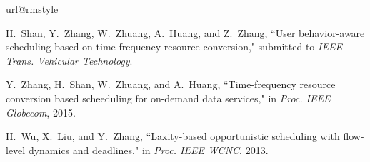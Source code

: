 \documentclass[journal,letterpaper,12pt,oneside,onecolumn,draftclsnofoot]{IEEEtran}
\begin{document}
\begin{thebibliography}{10}

\providecommand{\url}[1]{#1} \csname url@rmstyle\endcsname
\providecommand{\newblock}{\relax} \providecommand{\bibinfo}[2]{#2}
\providecommand\BIBentrySTDinterwordspacing{\spaceskip=0pt\relax}
\providecommand\BIBentryALTinterwordstretchfactor{4}
\providecommand\BIBentryALTinterwordspacing{\spaceskip=\fontdimen2\font
plus \BIBentryALTinterwordstretchfactor\fontdimen3\font minus
  \fontdimen4\font\relax}
\providecommand\BIBforeignlanguage[2]{{\expandafter\ifx\csname l@#1\endcsname\relax
\typeout{** WARNING: IEEEtran.bst: No hyphenation pattern has been}\typeout{** loaded for the language `#1'. Using the pattern for}\typeout{** the default language instead.}\else \language=\csname l@#1\endcsname \fi #2}}

H.~Shan, Y.~Zhang, W.~Zhuang, A.~Huang, and Z.~Zhang, ``User behavior-aware scheduling based on time-frequency resource conversion," submitted to \emph{ IEEE Trans. Vehicular Technology}.

Y.~Zhang, H.~Shan, W.~Zhuang, and A.~Huang, ``Time-frequency resource conversion based scheeduling for on-demand data services," in \emph{Proc. IEEE Globecom}, 2015.

H.~Wu, X.~Liu, and Y.~Zhang, ``Laxity-based opportunistic scheduling with flow-level dynamics and deadlines," in \emph{Proc. IEEE WCNC}, 2013.


\end{thebibliography}
\end{document}
